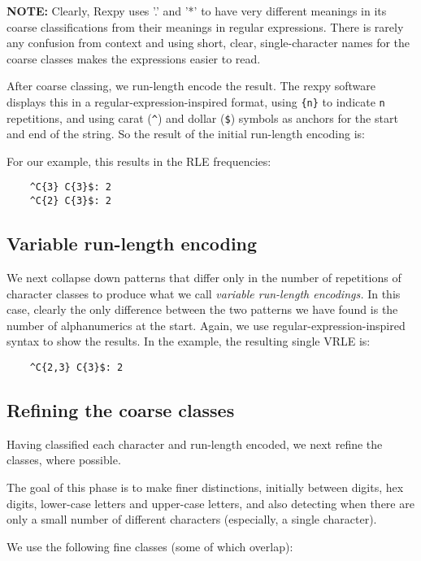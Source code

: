 \documentclass{article}
\begin{document}
{\bf NOTE:} Clearly, Rexpy uses '.' and '*' to have very different meanings in
its coarse classifications from their meanings in regular expressions.
There is rarely any confusion from context and using short, clear,
single-character names for the coarse classes makes the expressions easier
to read.

After coarse classing, we run-length encode the result.
The rexpy software displays this in a regular-expression-inspired format,
using \verb+{n}+ to indicate \verb+n+ repetitions, and using carat (\verb+^+)
and dollar (\verb+$+) symbols as anchors for the start and end of the string.
So the result of the initial run-length encoding is:

For our example, this results in the RLE frequencies:
\begin{verbatim}
    ^C{3} C{3}$: 2
    ^C{2} C{3}$: 2
\end{verbatim}

\subsection{Variable run-length encoding}

We next collapse down patterns that differ only in the number of repetitions
of character classes to produce what we call {\it variable run-length
encodings.\/} In this case, clearly the only difference between the
two patterns we have found is the number of alphanumerics at the start.
Again, we use regular-expression-inspired syntax to show the results.
In the example, the resulting single VRLE is:
\begin{verbatim}
    ^C{2,3} C{3}$: 2
\end{verbatim}


\subsection{Refining the coarse classes}

Having classified each character and run-length encoded, we next refine
the classes, where possible.

The goal of this phase is to make finer distinctions, initially
between digits, hex digits, lower-case letters and upper-case letters,
and also detecting when there are only a small number of different characters
(especially, a single character).

We use the following fine classes (some of which overlap):
\end{document}
